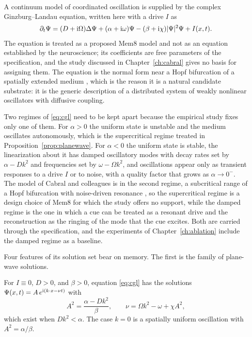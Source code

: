 A continuum model of coordinated oscillation is supplied by the complex Ginzburg--Landau equation, written here with a drive $I$ as
\begin{equation}\label{eq:cgl}
\partial_t\Psi=(D+\mathrm{i}\Omega)\Delta\Psi+(\alpha+\mathrm{i}\omega)\Psi-(\beta+\mathrm{i}\chi)|\Psi|^2\Psi+I(x,t).
\end{equation}
The equation is treated as a proposed Mem8 model and not as an equation established by the neuroscience; its coefficients are free parameters of the specification, and the study discussed in Chapter~\ref{ch:cabral} gives no basis for assigning them. The equation is the normal form near a Hopf bifurcation of a spatially extended medium \cite{aranson2002}, which is the reason it is a natural candidate substrate: it is the generic description of a distributed system of weakly nonlinear oscillators with diffusive coupling.

Two regimes of \eqref{eq:cgl} need to be kept apart because the empirical study fixes only one of them. For $\alpha>0$ the uniform state is unstable and the medium oscillates autonomously, which is the supercritical regime treated in Proposition~\ref{prop:planewave}. For $\alpha<0$ the uniform state is stable, the linearization about it has damped oscillatory modes with decay rates set by $\alpha-Dk^2$ and frequencies set by $\omega-\Omega k^2$, and oscillations appear only as transient responses to a drive $I$ or to noise, with a quality factor that grows as $\alpha\to0^-$. The model of Cabral and colleagues is in the second regime, a subcritical range of a Hopf bifurcation with noise-driven resonance \cite{cabral2023}, so the supercritical regime is a design choice of Mem8 for which the study offers no support, while the damped regime is the one in which a cue can be treated as a resonant drive and the reconstruction as the ringing of the mode that the cue excites. Both are carried through the specification, and the experiments of Chapter~\ref{ch:ablation} include the damped regime as a baseline.

Four features of its solution set bear on memory. The first is the family of plane-wave solutions.

\begin{proposition}\label{prop:planewave}
For $I\equiv0$, $D>0$, and $\beta>0$, equation \eqref{eq:cgl} has the solutions $\Psi(x,t)=A\,e^{\mathrm{i}(k\cdot x-\nu t)}$ with
\begin{equation}
A^2=\frac{\alpha-Dk^2}{\beta},\qquad \nu=\Omega k^2-\omega+\chi A^2,
\end{equation}
which exist when $Dk^2<\alpha$. The case $k=0$ is a spatially uniform oscillation with $A^2=\alpha/\beta$.
\end{proposition}

